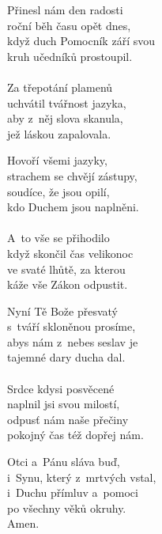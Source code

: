 \begin{translatioMulticol}{4}
Přinesl nám den radosti\\
roční běh času opět dnes,\\
když duch Pomocník září svou\\
kruh učedníků prostoupil.\\
\\
Za třepotání plamenů\\
uchvátil tvářnost jazyka,\\
aby z~něj slova skanula,\\
jež láskou zapalovala.\columnbreak

Hovoří všemi jazyky,\\
strachem se chvějí zástupy,\\
soudíce, že jsou opilí,\\
kdo Duchem jsou naplněni.\\
\\
A~to vše se přihodilo\\
když skončil čas velikonoc\\
ve svaté lhůtě, za kterou\\
káže vše Zákon odpustit.\columnbreak

Nyní Tě Bože přesvatý\\
s~tváří skloněnou prosíme,\\
abys nám z~nebes seslav je\\
tajemné dary ducha dal.\\
\\
Srdce kdysi posvěcené\\
naplnil jsi svou milostí,\\
odpusť nám naše přečiny\\
pokojný čas též dopřej nám.\columnbreak

Otci a~Pánu sláva buď,\\
i~Synu, který z~mrtvých vstal,\\
i~Duchu přímluv a~pomoci\\
po všechny věků okruhy.\\
Amen.
\end{translatioMulticol}
